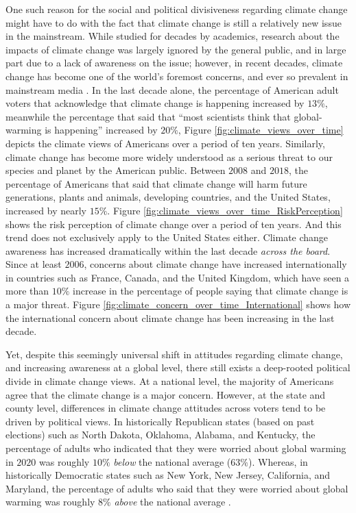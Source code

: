 \documentclass{paper}
\begin{document}
One such reason for the social and political divisiveness regarding climate change might have to do with the fact that climate change is still a relatively new issue in the mainstream. While studied for decades by academics, research about the impacts of climate change was largely ignored by the general public, and in large part due to a lack of awareness on the issue; however, in recent decades, climate change has become one of the world's foremost concerns, and ever so prevalent in mainstream media \cite{climate_change_media_coverage, nasa:climate_change_consensus}. In the last decade alone, the percentage of American adult voters that acknowledge that climate change is happening increased by $13\%$, meanwhile the percentage that said that ``most scientists think that global-warming is happening'' increased by $20\%$, Figure \ref{fig:climate_views_over_time} depicts the climate views of Americans over a period of ten years. Similarly, climate change has become more widely understood as a serious threat to our species and planet by the American public. Between $2008$ and $2018$, the percentage of Americans that said that climate change will harm future generations, plants and animals, developing countries, and the United States, increased by nearly $15\%$. Figure \ref{fig:climate_views_over_time_RiskPerception} shows the risk perception of climate change over a period of ten years. And this trend does not exclusively apply to the United States either. Climate change awareness has increased dramatically within the last decade \textit{across the board}. Since at least $2006$, concerns about climate change have increased internationally in countries such as France, Canada, and the United Kingdom, which have seen a more than $10\%$ increase in the percentage of people saying that climate change is a major threat. Figure \ref{fig:climate_concern_over_time_International} shows how the international concern about climate change has been increasing in the last decade.

Yet, despite this seemingly universal shift in attitudes regarding climate change, and increasing awareness at a global level, there still exists a deep-rooted political divide in climate change views. At a national level, the majority of Americans agree that the climate change is a major concern. However, at the state and county level, differences in climate change attitudes across voters tend to be driven by political views. In historically Republican states (based on past elections) such as North Dakota, Oklahoma, Alabama, and Kentucky, the percentage of adults who indicated that they were worried about global warming in $2020$ was roughly $10\%$ \textit{below} the national average ($63\%$). Whereas, in historically Democratic states such as New York, New Jersey, California, and Maryland, the percentage of adults who said that they were worried about global warming was roughly $8\%$ \textit{above} the national average \cite{Ballew2019, https://doi.org/10.17605/osf.io/jw79p}.
\end{document}

